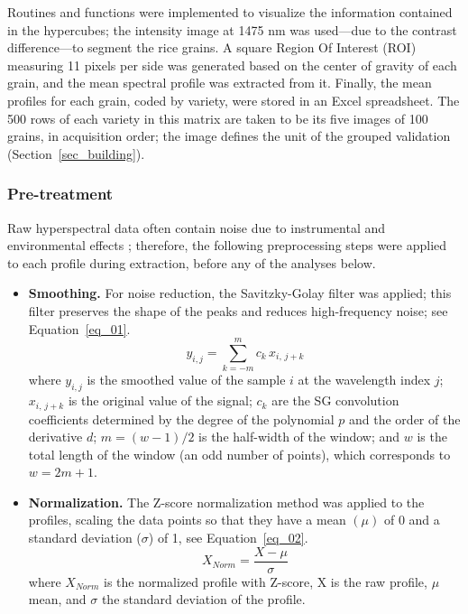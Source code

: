 \documentclass[final,5p,times,twocolumn]{elsarticle}
\newcommand{\added}[1]{{\color{blue}#1}}
\begin{document}
Routines and functions were implemented to visualize the information contained in the hypercubes; the intensity image at 1475 nm was used—due to the contrast difference—to segment the rice grains.
A square Region Of Interest (ROI) measuring 11 pixels per side was generated based on the center of gravity of each grain, and the mean spectral profile was extracted from it.
Finally, the mean profiles for each grain, coded by variety, were stored in an Excel spreadsheet.
\added{The 500 rows of each variety in this matrix are taken to be its five images of 100 grains, in acquisition order; the image defines the unit of the grouped validation (Section~\ref{sec_building}).}

\subsubsection{Pre-treatment}

Raw hyperspectral data often contain noise due to instrumental and environmental effects \cite{vasquez2018}; therefore, the following preprocessing steps were applied to each profile during extraction, before any of the analyses below.

\begin{itemize}
    \item \textbf{Smoothing.} For noise reduction, the  Savitzky-Golay filter was applied; this filter preserves the shape of the peaks and reduces high-frequency noise; see Equation~\ref{eq_01}.
    \begin{equation}
        y_{i,j} = \sum_{k=-m}^{m} c_{k}\, x_{i,\,j+k}
        \label{eq_01}        
    \end{equation}
    where $y_{i,j}$ is the smoothed value of the sample $i$ at the wavelength index $j$; $x_{i,\,j+k}$ is the original value of the signal; $c_{k}$ are the SG convolution coefficients determined by the degree of the polynomial $p$ and the order of the derivative $d$; $m = (w-1)/2$ is the half-width of the window; and $w$ is the total length of the window (an odd number of points), which corresponds to $w = 2m + 1$.

    \item \textbf{Normalization.} The Z-score normalization method was applied to the profiles, scaling the data points so that they have a mean $(\mu)$ of 0 and a standard deviation ($\sigma$) of 1, see Equation~\ref{eq_02}.
    \begin{equation}
        X_{Norm} = \frac{X-\mu}{\sigma}
        \label{eq_02}
    \end{equation}
     where $X_{Norm}$ is the normalized profile with Z-score, X is the raw profile, $\mu$ mean, and $\sigma$ the standard deviation of the profile.
\end{itemize}
\end{document}
